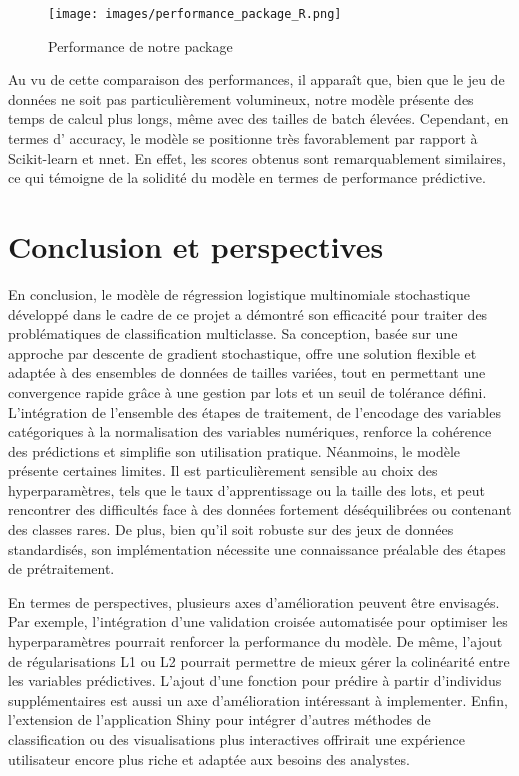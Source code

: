 \documentclass{rapport}
\begin{document}
\begin{figure}[h!]
    \centering
    \texttt{[image: images/performance\_package\_R.png]}
    \caption{Performance de notre package}
    \label{fig:package-R}
\end{figure}


Au vu de cette comparaison des performances, il apparaît que, bien que le jeu de données ne soit pas particulièrement volumineux, notre modèle présente des temps de calcul plus longs, même avec des tailles de batch élevées. Cependant, en termes d' accuracy, le modèle se positionne très favorablement par rapport à Scikit-learn et nnet. En effet, les scores obtenus sont remarquablement similaires, ce qui témoigne de la solidité du modèle en termes de performance prédictive.


 
\section*{Conclusion et perspectives}
En conclusion, le modèle de régression logistique multinomiale stochastique développé dans le cadre de ce projet a démontré son efficacité pour traiter des problématiques de classification multiclasse. Sa conception, basée sur une approche par descente de gradient stochastique, offre une solution flexible et adaptée à des ensembles de données de tailles variées, tout en permettant une convergence rapide grâce à une gestion par lots et un seuil de tolérance défini. L’intégration de l’ensemble des étapes de traitement, de l’encodage des variables catégoriques à la normalisation des variables numériques, renforce la cohérence des prédictions et simplifie son utilisation pratique. Néanmoins, le modèle présente certaines limites. Il est particulièrement sensible au choix des hyperparamètres, tels que le taux d'apprentissage ou la taille des lots, et peut rencontrer des difficultés face à des données fortement déséquilibrées ou contenant des classes rares. De plus, bien qu’il soit robuste sur des jeux de données standardisés, son implémentation nécessite une connaissance préalable des étapes de prétraitement. 

En termes de perspectives, plusieurs axes d’amélioration peuvent être envisagés. Par exemple, l’intégration d’une validation croisée automatisée pour optimiser les hyperparamètres pourrait renforcer la performance du modèle. De même, l’ajout de régularisations L1 ou L2 pourrait permettre de mieux gérer la colinéarité entre les variables prédictives. L'ajout d'une fonction pour prédire à partir d'individus supplémentaires est aussi un axe d'amélioration intéressant à implementer.
Enfin, l’extension de l’application Shiny pour intégrer d’autres méthodes de classification ou des visualisations plus interactives offrirait une expérience utilisateur encore plus riche et adaptée aux besoins des analystes.
\end{document}
